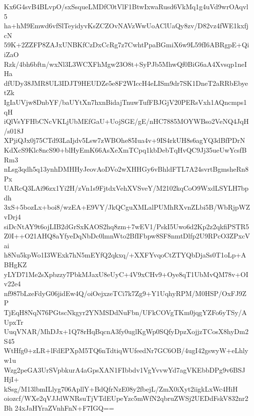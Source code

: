 Kx6G4svB4BLvpO/sxSsqueLMDfC0tVlF1BtwIxwaRusd6VkMq1g4uVd9wrOAqvl5
ha+hM9Emwd6vfSlTeyidyvKsZCZOvNAVzWwUoAClUaQy8zv/D82vz4fWE1kxfjcN
59K+2ZZFP8ZAJxUNBKfCzDxCcRg7z7CwhtPpaBGmiX6w9L59fI6ABRgpE+QiiZaO
Rzk/4bh6bftn/wxNl3L3WCXFhMgw23O8t+SyPJb5MhwQf0BiG6aA4Xvsqp1neIHa
dfUDy38JMR8UL3IDJT9HEUDZe5e8F2WIccH4eLISm9dr7SK1DneT2aRRbEbyetZk
IgIaUVjw8DnbYF/baUYtXn7hxnBidajTnuwTufFBJGjV20PERsVxh1AQncmps1qH
iQlVsYFHbCNcVKLjUbMEfGaU+UojSGE/gE/nHC7885MOYWBso2VeNQ4JqH/s018J
XPjiQJx0j75CTd93LaIjdv5Lsw7zWBOhe85Iua4v+9IS4rkUH8s6agYQ3dBfPDrN
KdXcS9Klc8ncS90+blHyEmK66AsXeXmTCpq1kbDebTqHvQC9Jj35ueUwYcsfBRm3
nLsg3qdh5q13ynhDMHHyJeovAoDVo2wXHHGy6vBhldFTL7A24svrtBgmsheRn8Px
UARcQ3LAi96zx1Yi2H/zVn1s9FjtdxVehXVSveY/M2102kqCoO9WxdLSYLH7bpdh
3xS+5bozLx+boi8/wzEA+E9VY/JkQCguXMLalPUMhRXvnZLbi5B/WbRjpWZvDrj4
siDcNtAY9t6ojLIB2dGrSxKAOS2hq8zm+7wEV1/PskI5Uwo6d2Kp2z2qkfiPSTR5
Z0I++O21AHQ8aYfyeDqNbDc0lmnWto2BfIFbpw8SF8nmtDlfp2U9RPcO3ZPxcVai
h8Nu5kpWo1I3WExk7hN5mEYfQ2qkxq/+XXFYvqoCtZTYQbDjaSs0T1oLp+ABHgKZ
yLYD71Me2sXpbzzy7PbkMJaxU8eUyC+4V9xCHv9+Oye8qT1UbMvQM78v+OIv22e4
nf987bLzeFdyG06jidEw4Q/oiOejxzeTCi7k7Zg9+Y1UqhyRPM/M0HSP/OxFJ9ZP
TjEqH8NqN76PGtscNkgyr2YNMSDdNuFbn/UFkCOVgTKm0jqgYZFo6yTSy/AUpxTr
UuqVNAR/MhDJx+1Q78rHqBqcnA3fy0uglKgWp0SQfyDpzXojjzTCosX8hyDm2S45
WtHfg0+zLR+lFdEPXpM5TQ6nTdtiqWUfeedNr7GC6OB/4ugI42gswyW+eLhlyw1u
Wzg2peGA3UrSVpbkurA4aGpsXAN1FIbbdv1VgYvvwYd7agVKEbbDPg9v6BSJHjI+
kSsg/M13lbmILlyg706ApllY+BdQfrNzE08y2fbejL/ZmX0iXyt2iigkLxWc4HiH
oiozcf/WXe2qVJJdWNRsuTjVTdEUpeYzc5mWfN2qbruZWSj2UEDdFskV832nr2Bh
24xJaHYraZVnhFnN+F7IGQ==
